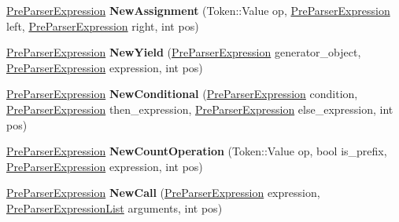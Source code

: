 \begin{DoxyCompactItemize}
\item 
\hyperlink{classv8_1_1internal_1_1_pre_parser_expression}{Pre\+Parser\+Expression} {\bfseries New\+Assignment} (Token\+::\+Value op, \hyperlink{classv8_1_1internal_1_1_pre_parser_expression}{Pre\+Parser\+Expression} left, \hyperlink{classv8_1_1internal_1_1_pre_parser_expression}{Pre\+Parser\+Expression} right, int pos)\hypertarget{classv8_1_1internal_1_1_pre_parser_factory_a26329fb85960f6ca977bc611780a6620}{}\label{classv8_1_1internal_1_1_pre_parser_factory_a26329fb85960f6ca977bc611780a6620}

\item 
\hyperlink{classv8_1_1internal_1_1_pre_parser_expression}{Pre\+Parser\+Expression} {\bfseries New\+Yield} (\hyperlink{classv8_1_1internal_1_1_pre_parser_expression}{Pre\+Parser\+Expression} generator\+\_\+object, \hyperlink{classv8_1_1internal_1_1_pre_parser_expression}{Pre\+Parser\+Expression} expression, int pos)\hypertarget{classv8_1_1internal_1_1_pre_parser_factory_ac23beefe249d53df92ed7c09a34126e6}{}\label{classv8_1_1internal_1_1_pre_parser_factory_ac23beefe249d53df92ed7c09a34126e6}

\item 
\hyperlink{classv8_1_1internal_1_1_pre_parser_expression}{Pre\+Parser\+Expression} {\bfseries New\+Conditional} (\hyperlink{classv8_1_1internal_1_1_pre_parser_expression}{Pre\+Parser\+Expression} condition, \hyperlink{classv8_1_1internal_1_1_pre_parser_expression}{Pre\+Parser\+Expression} then\+\_\+expression, \hyperlink{classv8_1_1internal_1_1_pre_parser_expression}{Pre\+Parser\+Expression} else\+\_\+expression, int pos)\hypertarget{classv8_1_1internal_1_1_pre_parser_factory_ac63b1c1172261f9b62ee11726fc5c3d9}{}\label{classv8_1_1internal_1_1_pre_parser_factory_ac63b1c1172261f9b62ee11726fc5c3d9}

\item 
\hyperlink{classv8_1_1internal_1_1_pre_parser_expression}{Pre\+Parser\+Expression} {\bfseries New\+Count\+Operation} (Token\+::\+Value op, bool is\+\_\+prefix, \hyperlink{classv8_1_1internal_1_1_pre_parser_expression}{Pre\+Parser\+Expression} expression, int pos)\hypertarget{classv8_1_1internal_1_1_pre_parser_factory_afcc21d34ee225658881c7d8241e8e6d6}{}\label{classv8_1_1internal_1_1_pre_parser_factory_afcc21d34ee225658881c7d8241e8e6d6}

\item 
\hyperlink{classv8_1_1internal_1_1_pre_parser_expression}{Pre\+Parser\+Expression} {\bfseries New\+Call} (\hyperlink{classv8_1_1internal_1_1_pre_parser_expression}{Pre\+Parser\+Expression} expression, \hyperlink{classv8_1_1internal_1_1_pre_parser_list}{Pre\+Parser\+Expression\+List} arguments, int pos)\hypertarget{classv8_1_1internal_1_1_pre_parser_factory_ab448811c02c34e1c7a408e2209517b36}{}\label{classv8_1_1internal_1_1_pre_parser_factory_ab448811c02c34e1c7a408e2209517b36}


\end{DoxyCompactItemize}
